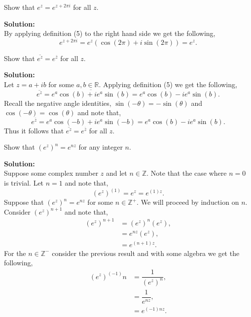 \documentclass[12pt]{article}
\makeatletter
\theoremstyle{homework}
\newenvironment{exercise}[1]
{\def\@currentlabel{#1}\exercisecore}
{\endexercisecore}
\newcommand{\localhead}[1]{\par\smallskip\noindent\textbf{#1}\nobreak\\}%
\newcommand\solution{\localhead{Solution:}}
\newcommand{\Reals}{\ensuremath{\mathbb R}}
\let\RR\Reals
\makeatother
\begin{document}
\begin{exercise}{7} Show that $e^z = e^{z + 2\pi i}$ for all $z$.\\
    \solution By applying definition (5) to the right hand side we get the following, 
    \begin{equation*}
        e^{z + 2\pi i} = e^{z}(\cos(2\pi) + i \sin(2\pi)) = e^z.
    \end{equation*}
\end{exercise}
\vspace{.5in}


\begin{exercise}{8b} Show that $\overline{e^z} = e^{\overline{z}}$ for all $z$.\\
    \solution Let $z = a + ib$ for some $a, b \in \RR$. Applying definition (5) we get the following, 
    \begin{equation*}
        \overline{e^z} = \overline{e^a\cos(b) + ie^a\sin(b)} =e^a\cos(b) - ie^a\sin(b). 
    \end{equation*}
    Recall the negative angle identities, $\sin(-\theta) = -\sin(\theta)$ and $\cos(-\theta) = \cos(\theta)$ and note that, 
    \begin{equation*}
        e^{\overline{z}} = e^a\cos(-b) + ie^a\sin(-b) =  e^a\cos(b) - ie^a\sin(b).
    \end{equation*}
    Thus it follows that $\overline{e^z} = e^{\overline{z}}$ for all $z$.
\end{exercise}
\vspace{.5in}



\begin{exercise}{9} Show that $(e^z)^n = e^{nz}$ for any integer $n$.\\
    \solution Suppose some complex number $z$ and let $n \in \mathbb{Z}$. Note that the case where $n = 0$ is trivial. Let $n = 1$ and 
    note that, 
    \begin{equation*}
        (e^z)^{(1)} = e^{z} = e^{(1)z}. 
    \end{equation*} 
    Suppose that $(e^z)^n = e^{nz}$ for some $n \in \mathbb{Z}^+$. We will proceed by induction on $n$. Consider $(e^z)^{n+1}$ and note that, 
    \begin{align*}
        (e^z)^{n+1} &= (e^z)^{n} (e^z),\\
         &= e^{nz} (e^z),\\ 
         &= e^{(n+1)z}. 
    \end{align*} 
    For the  $n \in \mathbb{Z}^-$ consider the previous result and with some algebra we get the following, 
    \begin{align*}
        (e^z)^{(-1)}n &= \dfrac{1}{(e^z)^n},\\
        &= \dfrac{1}{e^{nz}},\\
        &= e^{(-1)nz}.
    \end{align*}
\end{exercise}
\vspace{.5in}
\end{document}
